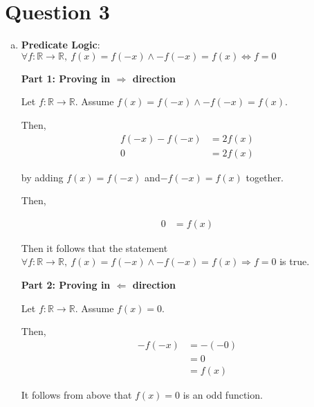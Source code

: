 \documentclass[12pt]{article}
\begin{document}
\section*{Question 3}

\begin{enumerate}[a.]
    \item

    \textbf{Predicate Logic}: $\forall f: \mathbb{R} \to \mathbb{R},\: f(x) = f(-x) \land
    -f(-x) = f(x) \Leftrightarrow f = 0$

    \bigbreak

    \textbf{Part 1: Proving in $\Rightarrow$ direction}

    \bigbreak

    Let $f: \mathbb{R} \to \mathbb{R}$. Assume $f(x) = f(-x) \land -f(-x)=f(x)$.

    \bigbreak

    Then,
    \setcounter{equation}{0}
    \begin{align}
        f(-x) - f(-x) &= 2f(x)\\
        0 &= 2f(x)
    \end{align}

    by adding $f(x) = f(-x)$ and$-f(-x) = f(x)$ together.

    \bigbreak

    Then,

    \begin{align}
        0 &= f(x)
    \end{align}

    \bigbreak

    Then it follows that the statement $\forall f: \mathbb{R} \to \mathbb{R},\:
    f(x) = f(-x) \land -f(-x) = f(x) \Rightarrow f = 0$ is true.

    \bigbreak

    \textbf{Part 2: Proving in $\Leftarrow$ direction}

    \bigbreak

    Let $f: \mathbb{R} \to \mathbb{R}$. Assume $f(x) = 0$.

    \bigbreak

    Then,
    \setcounter{equation}{0}
    \begin{align}
        -f(-x) &= -(-0)\\
        &= 0\\
        &= f(x)
    \end{align}

    It follows from above that $f(x) = 0$ is an odd function.


\end{enumerate}
\end{document}
